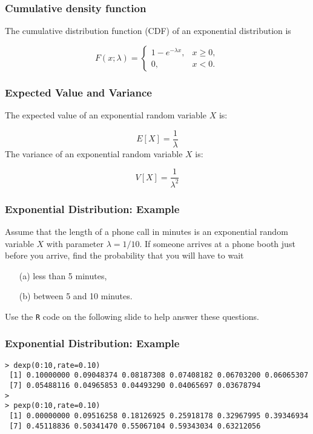 \documentclass[a4]{beamer}
\begin{document}
\begin{frame}[fragile]
\frametitle{Cumulative density function}
The cumulative distribution function (CDF) of an exponential distribution is

\[
F(x;\lambda) = \begin{cases}
1-e^{-\lambda x}, & x \ge 0, \\
0, & x < 0.
\end{cases}\]

\end{frame}

\begin{frame}[fragile]
\frametitle{Expected Value and Variance}
The expected value of an exponential random variable $X$ is:

\[
E[X] = \frac{1}{\lambda}\]
The variance of an exponential random variable $X$ is:

\[
V[X] = \frac{1}{\lambda^2}\]

\end{frame}

\begin{frame}[fragile]
\frametitle{Exponential Distribution: Example}
Assume that the length of a phone call in minutes is an exponential random variable $X$ with parameter
$\lambda = 1/10$. If someone arrives at a phone booth just before you arrive, find the probability that you
will have to wait \begin{itemize}
\item[(a)] less than 5 minutes,  
\item[(b)] between 5 and 10 minutes.
\end{itemize}
Use the \texttt{R} code on the following slide to help answer these questions.
\end{frame}



\begin{frame}[fragile]
\frametitle{Exponential Distribution: Example}
\begin{verbatim}
> dexp(0:10,rate=0.10)
 [1] 0.10000000 0.09048374 0.08187308 0.07408182 0.06703200 0.06065307
 [7] 0.05488116 0.04965853 0.04493290 0.04065697 0.03678794
>
> pexp(0:10,rate=0.10)
 [1] 0.00000000 0.09516258 0.18126925 0.25918178 0.32967995 0.39346934
 [7] 0.45118836 0.50341470 0.55067104 0.59343034 0.63212056
\end{verbatim}
\end{frame}
\end{document}
